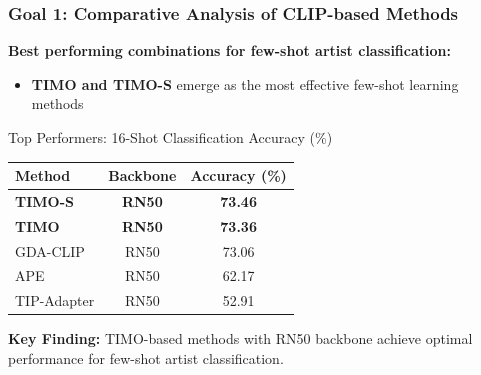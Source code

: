 \documentclass[aspectratio=169,xcolor=dvipsnames]{beamer}
\begin{document}
\begin{frame}
  \frametitle{Goal 1: Comparative Analysis of CLIP-based Methods}
  \textbf{Best performing combinations for few-shot artist classification:}

  \begin{itemize}
    \item \textbf{TIMO and TIMO-S} emerge as the most effective few-shot learning methods
  \end{itemize}

  \begin{block}{Top Performers: 16-Shot Classification Accuracy (\%)}
    \centering
    \tiny
    \begin{tabular}{@{}lcc@{}}
      \toprule
      \textbf{Method} & \textbf{Backbone} & \textbf{Accuracy (\%)} \\
      \midrule
      \textbf{TIMO-S}    & \textbf{RN50} & \textbf{73.46} \\
      \textbf{TIMO}      & \textbf{RN50} & \textbf{73.36} \\
      GDA-CLIP  & RN50 & 73.06 \\
      APE       & RN50 & 62.17 \\
      TIP-Adapter & RN50 & 52.91 \\
      \bottomrule
    \end{tabular}
    \normalsize
  \end{block}
  
  \textbf{Key Finding:} TIMO-based methods with RN50 backbone achieve optimal performance for few-shot artist classification.
\end{frame}
\end{document}
